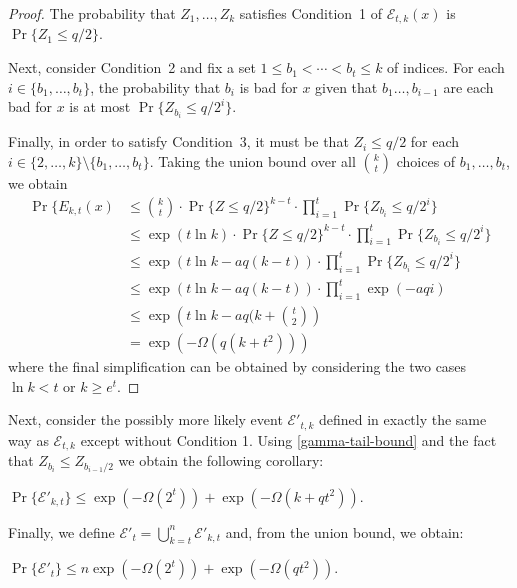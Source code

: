 \documentclass{patmorin}
\begin{document}
\begin{proof}
  The probability that $Z_1,\ldots,Z_k$ satisfies Condition~1 of $\mathcal{E}_{t,k}(x)$ is $\Pr\{Z_1 \le q/2\}$.
  
  Next, consider Condition~2 and
  fix a set $1\le b_1<\cdots<b_t\le k$ of indices. For each $i\in\{b_1,\ldots,b_t\}$, the probability that $b_i$ is bad for $x$ given that $b_{1}\ldots,b_{i-1}$ are each bad for $x$ is at most $\Pr\{Z_{b_i} \le q/2^i\}$.  
  
  Finally, in order to satisfy Condition~3, it must be that $Z_i \le q/2$ for each $i\in\{2,\ldots,k\}\setminus\{b_1,\ldots,b_t\}$.
  Taking the union bound over all $\binom{k}{t}$ choices of $b_1,\ldots,b_t$, we obtain 
  \begin{align*}
    \Pr\{E_{k,t}(x) &
    \le \binom{k}{t}
          \cdot \Pr\{Z \le q/2\}^{k-t}
          \cdot \prod_{i=1}^t\Pr\{Z_{b_i}\le q/2^i\} \\
    & \le \exp(t\ln k)
          \cdot \Pr\{Z \le q/2\}^{k-t}
          \cdot \prod_{i=1}^t\Pr\{Z_{b_i} \le q/2^i\} \\
    & \le \exp(t\ln k - aq(k-t))
          \cdot \prod_{i=1}^t\Pr\{Z_{b_i} \le q/2^i\} \\
    & \le \exp(t\ln k - aq(k-t))
          \cdot \prod_{i=1}^t\exp(-aqi) \\
    & \le \exp\left(t\ln k - aq(k + \binom{t}{2}\right) \\
    & = \exp\left(-\Omega(q(k+t^2))\right)
  \end{align*}
  where the final simplification can be obtained by considering the two cases $\ln k < t$ or $k \ge e^t$.
\end{proof}

Next, consider the possibly more likely event $\mathcal{E}'_{t,k}$ defined in exactly the same way as $\mathcal{E}_{t,k}$ except without Condition 1.  Using \eqref{gamma-tail-bound} and the fact that $Z_{b_i} \le Z_{b_{i-1}/2}$ we obtain the following corollary:

\begin{lem}
  $\Pr\{\mathcal{E}'_{k,t}\}\le \exp(-\Omega(2^t))+\exp(-\Omega(k+qt^2))$.
\end{lem}

Finally, we define $\mathcal{E}'_{t} = \bigcup_{k=t}^n \mathcal{E'}_{k,t}$ and, from the union bound, we obtain:

\begin{lem}
  $\Pr\{\mathcal{E}'_{t}\}\le n\exp(-\Omega(2^t))+\exp(-\Omega(qt^2))$.
\end{lem}
\end{document}
